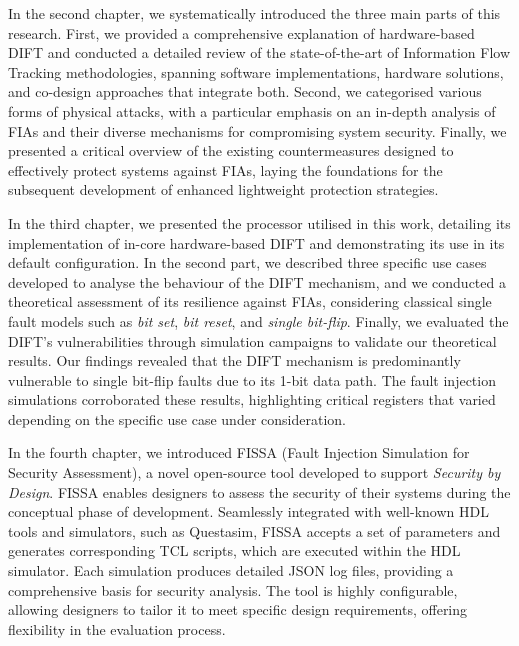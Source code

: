 In the second chapter, we systematically introduced the three main parts of this research. First, we provided a comprehensive explanation of hardware-based DIFT and conducted a detailed review of the state-of-the-art of Information Flow Tracking methodologies, spanning software implementations, hardware solutions, and co-design approaches that integrate both. Second, we categorised various forms of physical attacks, with a particular emphasis on an in-depth analysis of FIAs and their diverse mechanisms for compromising system security. Finally, we presented a critical overview of the existing countermeasures designed to effectively protect systems against FIAs, laying the foundations for the subsequent development of enhanced lightweight protection strategies.

In the third chapter, we presented the processor utilised in this work, detailing its implementation of in-core hardware-based DIFT and demonstrating its use in its default configuration. In the second part, we described three specific use cases developed to analyse the behaviour of the DIFT mechanism, and we conducted a theoretical assessment of its resilience against FIAs, considering classical single fault models such as \textit{bit set}, \textit{bit reset}, and \textit{single bit-flip}. Finally, we evaluated the DIFT's vulnerabilities through simulation campaigns to validate our theoretical results. Our findings revealed that the DIFT mechanism is predominantly vulnerable to single bit-flip faults due to its 1-bit data path. The fault injection simulations corroborated these results, highlighting critical registers that varied depending on the specific use case under consideration.

In the fourth chapter, we introduced FISSA (Fault Injection Simulation for Security Assessment), a novel open-source tool developed to support \textit{Security by Design}. FISSA enables designers to assess the security of their systems during the conceptual phase of development. Seamlessly integrated with well-known HDL tools and simulators, such as Questasim, FISSA accepts a set of parameters and generates corresponding TCL scripts, which are executed within the HDL simulator. Each simulation produces detailed JSON log files, providing a comprehensive basis for security analysis. The tool is highly configurable, allowing designers to tailor it to meet specific design requirements, offering flexibility in the evaluation process.


